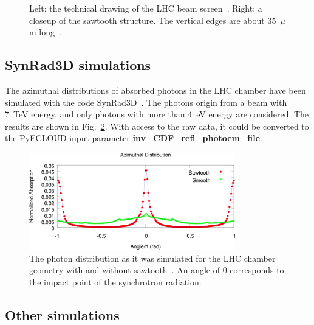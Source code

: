 \begin{figure}[tbh]
\begin{minipage}[c]{0.47\textwidth}
    \end{minipage}
\caption{
		Left: the technical drawing of the LHC beam screen~\cite{beam_screen_drawing}. Right: a closeup of the sawtooth structure. The vertical edges are about 35~$\mu$m long~\cite{zimmermann}.
		}
\label{fig:beam_screen_structure}
\end{figure}


\subsection{SynRad3D simulations}
The azimuthal distributions of absorbed photons in the LHC chamber have been simulated with the code SynRad3D~\cite{guillermo}.
The photons origin from a beam with 7~TeV energy, and only photons with more than 4~eV energy are considered.
The results are shown in Fig.~\ref{fig:guillermo}.
With access to the raw data, it could be converted to the PyECLOUD input parameter \textbf{inv\_CDF\_refl\_photoem\_file}.

\begin{figure}[tbh]
    \centering
    \includegraphics[width=0.8\textwidth]{../ss/photon_distribution_guillermo.png}
	\caption{The photon distribution as it was simulated for the LHC chamber geometry with and without sawtooth~\cite{guillermo}.
	An angle of 0 corresponds to the impact point of the synchrotron radiation.}
    \label{fig:guillermo}
\end{figure}


\subsection{Other simulations}

